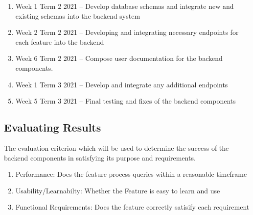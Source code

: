 \begin{enumerate}
\item Week 1 Term 2 2021 – Develop database schemas and integrate new and existing schemas into the backend system
\item Week 2 Term 2 2021 – Developing and integrating necessary endpoints for each feature into the backend
\item Week 6 Term 2 2021 – Compose user documentation for the backend components.
\item Week 1 Term 3 2021 – Develop and integrate any additional endpoints
\item Week 5 Term 3 2021 – Final testing and fixes of the backend components
\end{enumerate}

\subsection{Evaluating Results}
The evaluation criterion which will be used to determine the success of the backend components in satisfying its purpose and requirements.

\begin{enumerate}
    \item Performance: Does the feature process queries within a reasonable timeframe
    \item Usability/Learnabilty: Whether the Feature is easy to learn and use
    \item Functional Requirements: Does the feature correctly satisify each requirement
\end{enumerate}